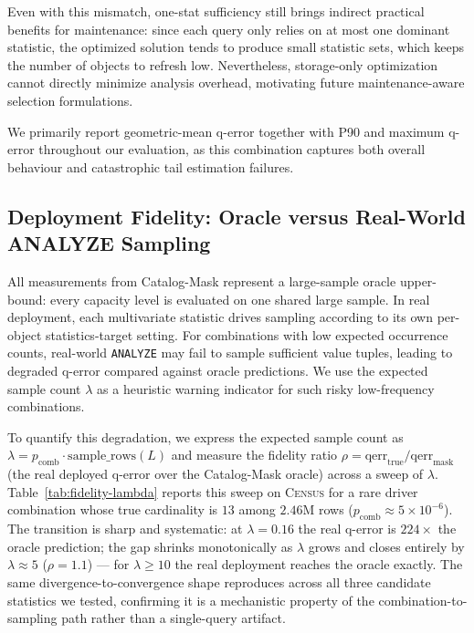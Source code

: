 \documentclass[sigconf, nonacm]{acmart}
\begin{document}
Even with this mismatch, one-stat sufficiency still brings indirect practical benefits for maintenance: since each query only relies on at most one dominant statistic, the optimized solution tends to produce small statistic sets, which keeps the number of objects to refresh low.
Nevertheless, storage-only optimization cannot directly minimize analysis overhead, motivating future maintenance-aware selection formulations.

We primarily report geometric-mean q-error together with P90 and maximum q-error throughout our evaluation, as this combination captures both overall behaviour and catastrophic tail estimation failures.

\subsection{Deployment Fidelity: Oracle versus Real-World ANALYZE Sampling}
\label{sec:fidelity_discussion}
\label{sec:disc-deployment}

All measurements from Catalog-Mask represent a large-sample oracle upper-bound: every capacity level is evaluated on one shared large sample.
In real deployment, each multivariate statistic drives sampling according to its own per-object statistics-target setting.
For combinations with low expected occurrence counts, real-world \texttt{ANALYZE} may fail to sample sufficient value tuples, leading to degraded q-error compared against oracle predictions.
We use the expected sample count $\lambda$ as a heuristic warning indicator for such risky low-frequency combinations.

To quantify this degradation, we express the expected sample count as
$\lambda=p_{\mathrm{comb}}\cdot\mathrm{sample\_rows}(L)$ and measure the
fidelity ratio $\rho=\mathrm{qerr}_{\mathrm{true}}/\mathrm{qerr}_{\mathrm{mask}}$
(the real deployed q-error over the Catalog-Mask oracle) across a sweep of
$\lambda$. Table~\ref{tab:fidelity-lambda} reports this sweep on \textsc{Census}
for a rare driver combination whose true cardinality is $13$ among $2.46$M rows
($p_{\mathrm{comb}}\approx5\times10^{-6}$). The transition is sharp and
systematic: at $\lambda=0.16$ the real q-error is \emph{$224\times$} the oracle
prediction; the gap shrinks monotonically as $\lambda$ grows and closes entirely
by $\lambda\approx5$ ($\rho=1.1$) --- for $\lambda\ge10$ the real deployment
reaches the oracle exactly. The same divergence-to-convergence shape reproduces
across all three candidate statistics we tested, confirming it is a mechanistic
property of the combination-to-sampling path rather than a single-query
artifact.
\end{document}
